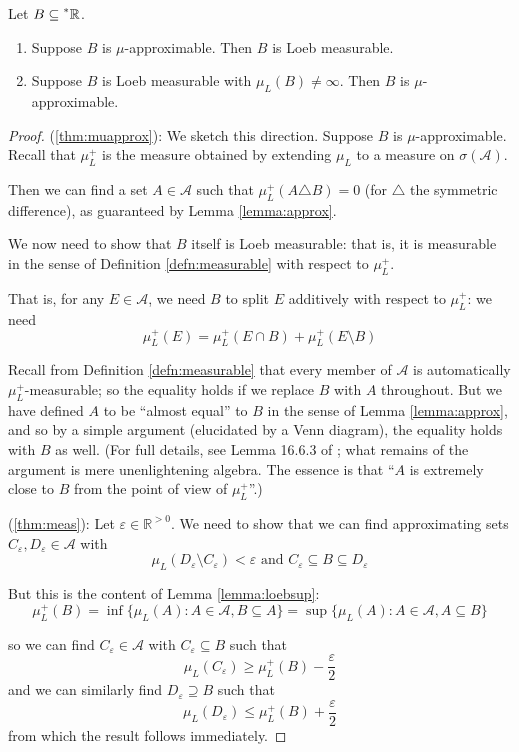 \documentclass[11pt]{amsart}
\theoremstyle{remark}
\newcommand{\hyp}[1][\mathbb{R}]{\prescript{*}{}{#1}}
\newcommand{\symdiff}{\triangle}
\begin{document}
\begin{thm} \label{thm:alternativeloeb} Let $B \subseteq \hyp$.
\
\begin{enumerate}
\item \label{thm:muapprox} Suppose $B$ is $\mu$-approximable. Then $B$ is Loeb measurable.
\item \label{thm:meas} Suppose $B$ is Loeb measurable with $\mu_L(B) \not = \infty$. Then $B$ is $\mu$-approximable.
\end{enumerate}
\end{thm}

\begin{proof}
(\ref{thm:muapprox}): We sketch this direction.
Suppose $B$ is $\mu$-approximable.
Recall that $\mu_L^+$ is the measure obtained by extending $\mu_L$ to a measure on $\sigma(\mathcal{A})$.

Then we can find a set $A \in \mathcal{A}$ such that $\mu_L^+ (A \symdiff B) = 0$ (for $\symdiff$ the symmetric difference), as guaranteed by Lemma \ref{lemma:approx}.

We now need to show that $B$ itself is Loeb measurable: that is, it is measurable in the sense of Definition \ref{defn:measurable} with respect to $\mu_L^+$.

That is, for any $E \in \mathcal{A}$, we need $B$ to split $E$ additively with respect to $\mu_L^+$: we need $$\mu_L^+(E) = \mu_L^+(E \cap B) + \mu_L^+(E \setminus B)$$

Recall from Definition \ref{defn:measurable} that every member of $\mathcal{A}$ is automatically $\mu_L^+$-measurable; so the equality holds if we replace $B$ with $A$ throughout.
But we have defined $A$ to be ``almost equal'' to $B$ in the sense of Lemma \ref{lemma:approx}, and so by a simple argument (elucidated by a Venn diagram), the equality holds with $B$ as well.
(For full details, see Lemma 16.6.3 of \cite{goldblatt}; what remains of the argument is mere unenlightening algebra.
The essence is that ``$A$ is extremely close to $B$ from the point of view of $\mu_L^+$''.)

(\ref{thm:meas}):
Let $\varepsilon \in \mathbb{R}^{>0}$.
We need to show that we can find approximating sets $C_{\varepsilon}, D_{\varepsilon} \in \mathcal{A}$ with $$\text{$\mu_L(D_{\varepsilon} \setminus C_{\varepsilon}) < \varepsilon$ and $C_{\varepsilon} \subseteq B \subseteq D_{\varepsilon}$}$$ 

But this is the content of Lemma \ref{lemma:loebsup}: $$\mu_L^+(B) = \inf \{ \mu_L(A) : A \in \mathcal{A}, B \subseteq A \} = \sup \{ \mu_L(A) : A \in \mathcal{A}, A \subseteq B \}$$

so we can find $C_{\varepsilon} \in \mathcal{A}$ with $C_{\varepsilon} \subseteq B$ such that $$\mu_L(C_{\varepsilon}) \geq \mu_L^+(B) - \frac{\varepsilon}{2}$$ and we can similarly find $D_{\varepsilon} \supseteq B$ such that $$\mu_L(D_{\varepsilon}) \leq \mu_L^+(B) + \frac{\varepsilon}{2}$$
from which the result follows immediately.
\end{proof}
\end{document}
